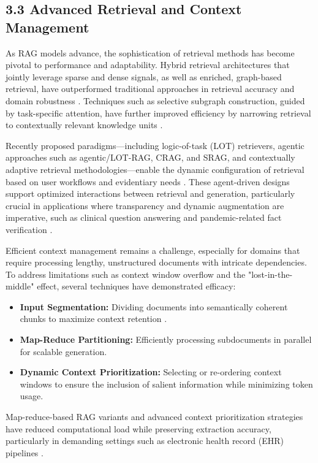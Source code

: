 \documentclass[11pt]{article}
\begin{document}
\subsection{3.3 Advanced Retrieval and Context Management}

As RAG models advance, the sophistication of retrieval methods has become pivotal to performance and adaptability. Hybrid retrieval architectures that jointly leverage sparse and dense signals, as well as enriched, graph-based retrieval, have outperformed traditional approaches in retrieval accuracy and domain robustness \cite{ref3,ref8,ref10,ref12,ref29,ref31,ref37,ref47,ref48,ref52,ref54}. Techniques such as selective subgraph construction, guided by task-specific attention, have further improved efficiency by narrowing retrieval to contextually relevant knowledge units \cite{ref48,ref52}.

Recently proposed paradigms—including logic-of-task (LOT) retrievers, agentic approaches such as agentic/LOT-RAG, CRAG, and SRAG, and contextually adaptive retrieval methodologies—enable the dynamic configuration of retrieval based on user workflows and evidentiary needs \cite{ref54,ref64}. These agent-driven designs support optimized interactions between retrieval and generation, particularly crucial in applications where transparency and dynamic augmentation are imperative, such as clinical question answering and pandemic-related fact verification \cite{ref54,ref64}.

Efficient context management remains a challenge, especially for domains that require processing lengthy, unstructured documents with intricate dependencies. To address limitations such as context window overflow and the "lost-in-the-middle" effect, several techniques have demonstrated efficacy:

\begin{itemize}
    \item \textbf{Input Segmentation:} Dividing documents into semantically coherent chunks to maximize context retention \cite{ref5,ref10,ref15,ref16,ref43,ref49,ref52,ref54,ref55}.
    \item \textbf{Map-Reduce Partitioning:} Efficiently processing subdocuments in parallel for scalable generation.
    \item \textbf{Dynamic Context Prioritization:} Selecting or re-ordering context windows to ensure the inclusion of salient information while minimizing token usage.
\end{itemize}

Map-reduce-based RAG variants and advanced context prioritization strategies have reduced computational load while preserving extraction accuracy, particularly in demanding settings such as electronic health record (EHR) pipelines \cite{ref5,ref52,ref55}.
\end{document}
